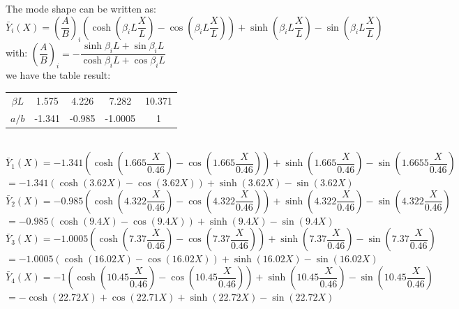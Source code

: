 \documentclass[14pt,a4paper]{article}
\begin{document}
\begin{enumerate}
	The mode shape can be written as:\\
	$\bar{Y}_i(X) = \left(\dfrac{A}{B}\right)_i\left(\cosh(\beta_iL\dfrac{X}{L}) - \cos(\beta_iL\dfrac{X}L)\right) + \sinh(\beta_iL\dfrac{X}{L}) - \sin(\beta_iL\dfrac{X}{L})$\\
	with: 	$\left(\dfrac{A}{B}\right)_i =  -\dfrac{ \sinh\beta_iL + \sin \beta_iL}{\cosh \beta_iL + \cos \beta_iL} $\\
	we have the table result:
	\begin{tabular} {c c c c c}
		$\beta L$ & 1.575 & 4.226 & 7.282 & 10.371 \\
		$a/b$ & -1.341 & -0.985 & -1.0005 & 1
	\end{tabular}\\
	$\bar{Y}_1(X) = -1.341\left(\cosh(1.665\dfrac{X}{0.46}) - \cos(1.665\dfrac{X}{0.46})\right) + \sinh(1.665\dfrac{X}{0.46}) - \sin(1.6655\dfrac{X}{0.46})$\\	
	\hspace*{0.9cm} $= -1.341\left(\cosh(3.62X) - \cos(3.62X)\right) + \sinh(3.62X) - \sin(3.62X)$\\	
	$\bar{Y}_2(X) = -0.985\left(\cosh(4.322\dfrac{X}{0.46}) - \cos(4.322\dfrac{X}{0.46})\right) + \sinh(4.322\dfrac{X}{0.46}) - \sin(4.322\dfrac{X}{0.46})$\\	
	\hspace*{0.9cm} $= -0.985\left(\cosh(9.4X) - \cos(9.4X)\right) + \sinh(9.4X) - \sin(9.4X)$\\
	$\bar{Y}_3(X) = -1.0005\left(\cosh(7.37\dfrac{X}{0.46}) - \cos(7.37\dfrac{X}{0.46})\right) + \sinh(7.37\dfrac{X}{0.46}) - \sin(7.37\dfrac{X}{0.46})$\\	
	\hspace*{0.9cm} $= -1.0005\left(\cosh(16.02X) - \cos(16.02X)\right) + \sinh(16.02X) - \sin(16.02X)$\\
	$\bar{Y}_4(X) = -1\left(\cosh(10.45\dfrac{X}{0.46}) - \cos(10.45\dfrac{X}{0.46})\right) + \sinh(10.45\dfrac{X}{0.46}) - \sin(10.45\dfrac{X}{0.46})$\\	
	\hspace*{0.9cm} $= -\cosh(22.72X) + \cos(22.71X) + \sinh(22.72X) - \sin(22.72X)$\\
	\pagebreak
	

\end{enumerate}
\end{document}
